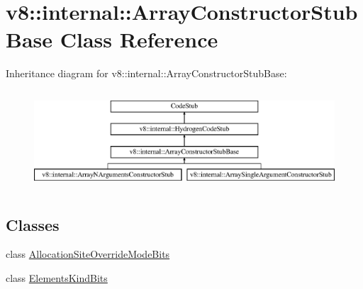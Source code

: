 \hypertarget{classv8_1_1internal_1_1_array_constructor_stub_base}{}\section{v8\+:\+:internal\+:\+:Array\+Constructor\+Stub\+Base Class Reference}
\label{classv8_1_1internal_1_1_array_constructor_stub_base}
Inheritance diagram for v8\+:\+:internal\+:\+:Array\+Constructor\+Stub\+Base\+:\begin{figure}[H]
\begin{center}
\leavevmode
\includegraphics[height=3.720930cm]{classv8_1_1internal_1_1_array_constructor_stub_base}
\end{center}
\end{figure}
\subsection*{Classes}
\begin{DoxyCompactItemize}
\item 
class \hyperlink{classv8_1_1internal_1_1_array_constructor_stub_base_1_1_allocation_site_override_mode_bits}{Allocation\+Site\+Override\+Mode\+Bits}
\item 
class \hyperlink{classv8_1_1internal_1_1_array_constructor_stub_base_1_1_elements_kind_bits}{Elements\+Kind\+Bits}
\end{DoxyCompactItemize}
